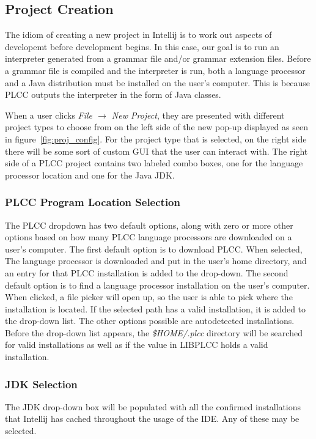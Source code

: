 \documentclass[conference, letterpaper]{IEEEtran}
\begin{document}
\subsection{Project Creation}\label{subsec:project-creation}
The idiom of creating a new project in Intellij is to work out aspects of developemt before development begins.
In this case, our goal is to run an interpreter generated from a grammar file and/or grammar extension files.
Before a grammar file is compiled and the interpreter is run, both a language processor and a Java distribution must be installed on the user's computer.
This is because PLCC outputs the interpreter in the form of Java classes.

When a user clicks \textit{File $\rightarrow$ New Project}, they are presented with different project types to choose from on the left side of the new pop-up displayed as seen in figure~\ref{fig:proj_config}.
For the project type that is selected, on the right side there will be some sort of custom GUI that the user can interact with.
The right side of a PLCC project contains two labeled combo boxes, one for the language processor location and one for the Java JDK.

\subsubsection{PLCC Program Location Selection}\label{subsubsec:plcc-program-location}
The PLCC dropdown has two default options, along with zero or more other options based on how many PLCC language processors are downloaded on a user's computer.
The first default option is to download PLCC\@.
When selected, The language processor is downloaded and put in the user's home directory, and an entry for that PLCC installation is added to the drop-down.
The second default option is to find a language processor installation on the user's computer.
When clicked, a file picker will open up, so the user is able to pick where the installation is located.
If the selected path has a valid installation, it is added to the drop-down list.
The other options possible are autodetected installations.
Before the drop-down list appears, the \textit{\$HOME/.plcc} directory will be searched for valid installations as well as if the value in LIBPLCC holds a valid installation.

\subsubsection{JDK Selection}\label{subsubsec:jdk-installation}
The JDK drop-down box will be populated with all the confirmed installations that Intellij has cached throughout the usage of the IDE. Any of these may be selected.
\end{document}
